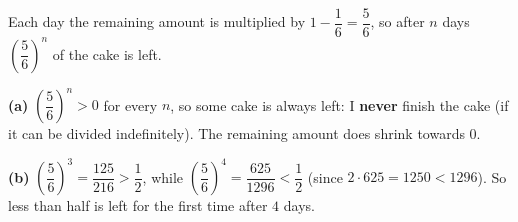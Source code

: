 Each day the remaining amount is multiplied by $1-\dfrac16=\dfrac56$, so after $n$ days $\left(\dfrac56\right)^n$ of the cake is left.

\textbf{(a)} $\left(\dfrac56\right)^n>0$ for every $n$, so some cake is always left: I \textbf{never} finish the cake (if it can be divided indefinitely). The remaining amount does shrink towards $0$.

\textbf{(b)} $\left(\dfrac56\right)^3=\dfrac{125}{216}>\dfrac12$, while $\left(\dfrac56\right)^4=\dfrac{625}{1296}<\dfrac12$ (since $2\cdot625=1250<1296$). So less than half is left for the first time after $\boxed{4}$ days.
